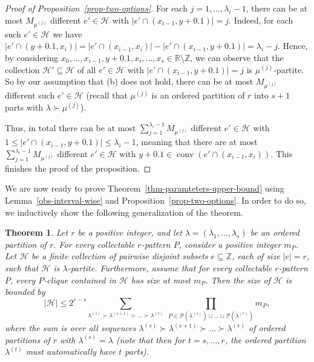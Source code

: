 \documentclass[11pt]{article}
\newtheorem{theorem}{Theorem}[section]
\theoremstyle{definition}
\numberwithin{equation}{section}
\numberwithin{figure}{section}
\newcommand{\su}{\subseteq}
\newcommand{\sm}{\setminus}
\newcommand{\Z}{\mathbb{Z}}
\newcommand{\HH}{\mathcal{H}}
\newcommand{\conv}{\operatorname{conv}}
\newcommand{\PP}{\mathcal{P}}
\begin{document}
\begin{proof}[Proof of Proposition~\ref{prop-two-options}]
For each $j=1,\dots,\lambda_i-1$, there can be at most $M_{\mu^{(j)}}$ different $e'\in\HH$ with $|e'\cap (x_{i-1},y+0.1)|=j$. Indeed, for each such $e'\in\HH$ we have $|e'\cap (y+0.1,x_i)|=|e'\cap (x_{i-1},x_i)|-|e'\cap (x_{i-1},y+0.1)|=\lambda_i-j$. Hence, by considering $x_0,\dots,x_{i-1}, y+0.1,x_i,\dots,x_s\in \mathbb{R}\sm \Z$, we can observe that the collection $\HH'\su \HH$ of all $e'\in\HH$ with $|e'\cap (x_{i-1},y+0.1)|=j$ is $\mu^{(j)}$-partite. So by our assumption that (b) does not hold, there can be at most $M_{\mu^{(j)}}$ different such $e'\in\HH$ (recall that $\mu^{(j)}$ is an ordered partition of $r$ into $s+1$ parts with $\lambda\succ \mu^{(j)}$).

Thus, in total there can be at most $\sum_{j=1}^{\lambda_i-1} M_{\mu^{(j)}}$ different $e'\in\HH$ with $1\le |e'\cap (x_{i-1},y+0.1)|\le \lambda_i-1$, meaning that there are at most $\sum_{j=1}^{\lambda_i-1} M_{\mu^{(j)}}$ different $e'\in\HH$ with $y+0.1\in \conv(e'\cap (x_{i-1},x_i))$. This finishes the proof of the proposition.
\end{proof}

We are now ready to prove Theorem~\ref{thm-paramteters-upper-bound} using Lemma~\ref{obs-interval-wise} and Proposition~\ref{prop-two-options}. In order to do so, we inductively show the following generalization of the theorem.

\begin{theorem} \label{thm-induction-upper-bound}
Let $r$ be a positive integer, and let $\lambda=(\lambda_1,\dots,\lambda_s)$ be an ordered partition of $r$. For every collectable $r$-pattern $P$, consider a positive integer $m_P$. Let $\HH$ be a finite collection of pairwise disjoint subsets $e\su \Z$, each of size $|e|=r$, such that $\HH$ is $\lambda$-partite. Furthermore, assume that for every collectable $r$-pattern $P$, every $P$-clique contained in $\HH$ has size at most $m_P$. Then the size of $\HH$ is bounded by
\begin{equation}
    |\HH|\le 2^{r-s} \sum_{\lambda^{(s)} \succ \lambda^{(s+1)} \succ \dots \succ \lambda^{(r)}}\ \prod_{ P\in \PP(\lambda^{(s)})\cup\dots\cup \PP(\lambda^{(r)}) } m_{P},
\end{equation}
where the sum is over all sequences $\lambda^{(s)} \succ \lambda^{(s+1)} \succ \dots \succ \lambda^{(r)}$ of ordered partitions of $r$ with $\lambda^{(s)}=\lambda$ (note that then for $t=s,\dots,r$, the ordered partition $\lambda^{(t)}$ must automatically have $t$ parts).
\end{theorem}
\end{document}
